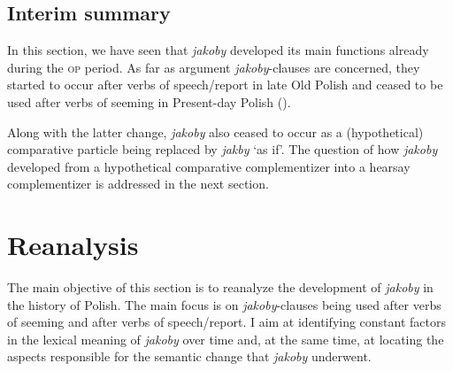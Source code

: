 \documentclass[output=paper]{langsci/langscibook}
\begin{document}
\subsection{Interim summary}

In this section, we have seen that \emph{jakoby} developed its main functions already during the \textsc{op} period. As far as argument \emph{jakoby}-clauses are concerned, they started to occur after verbs of speech\slash report in late Old Polish and ceased to be used after verbs of seeming in Present-day Polish ().

\begin{table}[h]
\caption{The development of \emph{jakoby}-argument clauses in the history of Polish\label{tab:jakoby:10}}
\end{table}

Along with the latter change, \emph{jakoby} also ceased to occur as a (hypothetical) comparative particle being replaced by \emph{jakby} `as if'. The question of how \emph{jakoby} developed from a hypothetical comparative complementizer into a hearsay complementizer is addressed in the next section.

\section{Reanalysis}\label{sec:jakoby:4}

The main objective of this section is to reanalyze the development of \emph{jakoby} in the history of Polish. The main focus is on \emph{jakoby}-clauses being used after verbs of seeming and after verbs of speech\slash report. I aim at identifying constant factors in the lexical meaning of \emph{jakoby} over time and, at the same time, at locating the aspects responsible for the semantic change that \emph{jakoby} underwent.
\end{document}
